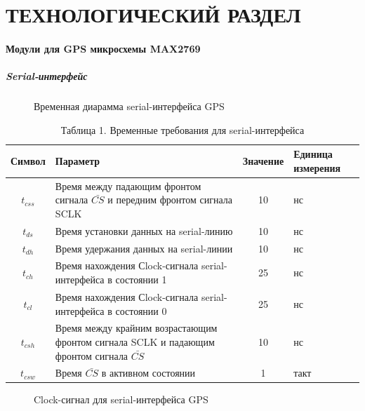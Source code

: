 \part{ТЕХНОЛОГИЧЕСКИЙ РАЗДЕЛ}

\subsection{Модули для GPS микросхемы MAX2769}


\subsubsection{Serial-интерфейс}

\begin{figure}[h]
\caption{Временная диарамма serial-интерфейса GPS}
\end{figure}

\begin{table}[h]
\caption{Таблица 1. Временные требования для serial-интерфейса}
\label{tabular:serial-time}
\begin{tabular}{|c|p{250pt}|c|p{70pt}|}
 \hline  
  Символ & Параметр & Значение & Единица измерения  \\  
 \hline  
  $t_{css}$  & Время между падающим фронтом сигнала $\bar {CS}$ и передним фронтом сигнала SCLK	& 10 & нс  \\  
 \hline  
  $t_{ds}$   & Время установки данных на serial-линию	& 10 & нс \\  
 \hline  
  $t_{dh}$   & Время удержания данных на serial-линии	& 10 & нс \\  
 \hline  
  $t_{ch}$   & Время нахождения Сlock-сигнала serial-интерфейса в состоянии 1 & 25 & нс \\  
 \hline  
  $t_{cl}$   & Время нахождения Сlock-сигнала serial-интерфейса в состоянии 0 & 25 & нс \\  
 \hline  
  $t_{csh}$  & Время между крайним возрастающим фронтом сигнала SCLK и падающим фронтом сигнала $\bar {CS}$ & 10 & нс \\  
 \hline  
  $t_{csw}$  & Время $\bar {CS}$ в активном состоянии    & 1 & такт \\  
 \hline  
\end{tabular}
\end{table}

\begin{figure}[h]
\caption{Clock-сигнал для serial-интерфейса GPS}
\end{figure}

\newpage
